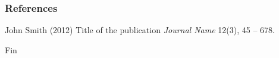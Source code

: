 \documentclass{beamer}
\begin{document}
\begin{frame}
\frametitle{References}
\footnotesize{
\begin{thebibliography}{99} %
 John Smith (2012)
\newblock Title of the publication
\newblock \emph{Journal Name} 12(3), 45 -- 678.
\end{thebibliography}
}
\end{frame}


\begin{frame}
\Huge{\centerline{Fin}}
\end{frame}

\end{document}
